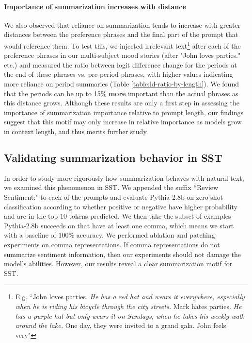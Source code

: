 \documentclass{article} %
\newcommand{\maxLDratio}{15\% }
\newcommand{\tokens}{\fontfamily{qhv}\selectfont \footnotesize}
\begin{document}
        \paragraph{Importance of summarization increases with distance}
        We also observed that reliance on summarization tends to increase with greater distances between the preference phrases and the final part of the prompt that would reference them. To test this, we injected irrelevant text\footnote{E.g. ``John loves parties. \textit{He has a red hat and wears it everywhere, especially when he is riding his bicycle through the city streets.} Mark hates parties. \textit{He has a purple hat but only wears it on Sundays, when he takes his weekly walk around the lake.} One day, they were invited to a grand gala. John feels very"} after each of the preference phrases in our multi-subject mood stories (after "John loves parties." etc.) and measured the ratio between logit difference change for the periods at the end of these phrases vs. pre-period phrases, with higher values indicating more reliance on period summaries (Table \ref{table:ld-ratio-by-length}). We found that the periods can be up to \maxLDratio \textbf{more} important than the actual phrases as this distance grows. Although these results are only a first step in assessing the importance of summarization importance relative to prompt length, our findings suggest that this motif may only increase in relative importance as models grow in context length, and thus merits further study.

    \subsection{Validating summarization behavior in SST}\label{section:summarization-treebank}
    In order to study more rigorously how summarization behaves with natural text, we examined this phenomenon in SST. We appended the suffix ``Review Sentiment:" to each of the prompts and evaluate Pythia-2.8b on zero-shot classification according to whether {\tokens positive} or {\tokens negative} have higher probability and are in the top 10 tokens predicted.  We then take the subset of examples Pythia-2.8b succeeds on that have at least one comma, which means we start with a baseline of 100\% accuracy. We performed ablation and patching experiments on comma representations. If comma representations do not summarize sentiment information, then our experiments should not damage the model's abilities. However, our results reveal a clear summarization motif for SST.
\end{document}

